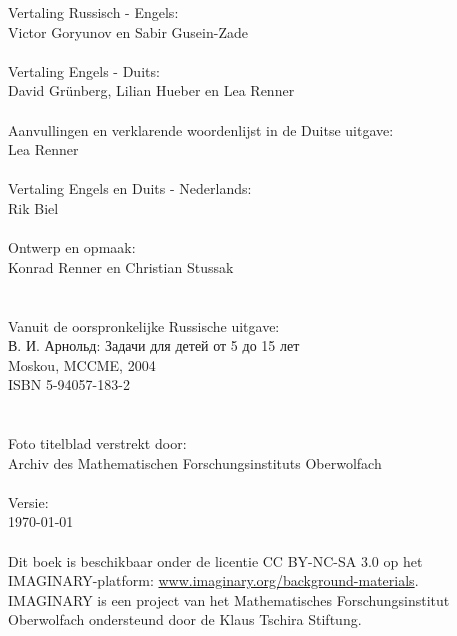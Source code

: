 \clearpage

\null\vfill
\noindent
Vertaling Russisch - Engels:\\
\null\quad Victor Goryunov en Sabir Gusein-Zade\\
\\
Vertaling Engels - Duits:\\
\null\quad David Grünberg, Lilian Hueber en Lea Renner\\
\\
Aanvullingen en verklarende woordenlijst in de Duitse uitgave:\\
\null\quad Lea Renner\\
\\
Vertaling Engels en Duits - Nederlands:\\
\null\quad Rik Biel\\
\\
Ontwerp en opmaak:\\
\null\quad Konrad Renner en Christian Stussak\\
\\
\\
Vanuit de oorspronkelijke Russische uitgave:\\
\null\quad \textrussian{В. И. Арнольд: Задачи для детей от 5 до 15 лет}\\
\null\quad Moskou, MCCME, 2004\\
\null\quad ISBN 5-94057-183-2\\
\\
\\
Foto titelblad verstrekt door:\\
\null\quad Archiv des Mathematischen Forschungsinstituts Oberwolfach\\
\\
Versie:\\
\null\quad \today\\
\\
Dit boek is beschikbaar onder de licentie CC BY-NC-SA 3.0 op het IMAGINARY-platform: \href{http://www.imaginary.org/background-materials}{www.imaginary.org/background-materials}.\\
IMAGINARY is een project van het Mathematisches Forschungsinstitut Oberwolfach ondersteund door de Klaus Tschira Stiftung.


